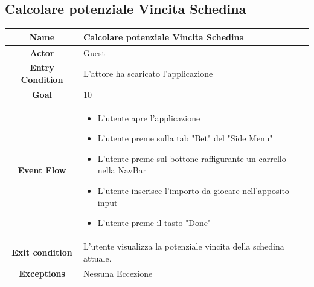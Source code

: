 \documentclass[numbers=noenddot, 12pt, a4paper, oneside]{scrbook}
\begin{document}
\subsection*{Calcolare potenziale Vincita Schedina}
\begin{tabular}{|c|p{}|}
	\hline
	\parbox[c][6ex]{6ex}{\centering \textbf{Name}} & Calcolare potenziale Vincita Schedina\\
	\hline
	\parbox[c][6ex]{6ex}{\centering \textbf{Actor}} & Guest \\
	\hline
	\parbox[c][10ex]{15ex}{\centering \textbf{Entry Condition}} & L'attore ha scaricato l'applicazione\\
	\hline
	\parbox[c][6ex]{15ex}{\centering \textbf{Goal}} &  10\\
	\hline
	\parbox[c][10ex]{12ex}{\centering \textbf{Event Flow}} & \begin{itemize}
		\item L'utente apre l'applicazione
		\item L'utente preme sulla tab "Bet" del "Side Menu"
		\item L'utente preme sul bottone raffigurante un carrello nella NavBar
		\item L'utente inserisce l'importo da giocare nell'apposito input
		\item L'utente preme il tasto "Done"
	\end{itemize}\\
	\hline
	\parbox[c][7ex]{12ex}{\centering \textbf{Exit condition}} & L'utente visualizza la potenziale vincita della schedina attuale.\\\hline
	\parbox[c][10ex]{13ex}{\centering \textbf{Exceptions}} & Nessuna Eccezione \\ \hline	
\end{tabular}
\newpage
\end{document}
